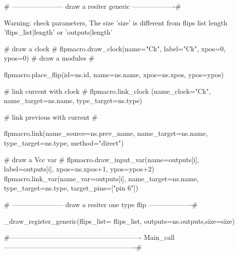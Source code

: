 {%
{%
{%
{# -----------------------
 draw a resiter generic
-------------------#}
{%

{%
 Warning: check parameters, The size '{{size}}' is different from flips list length '{{flips_list|length}}' or
 '{{outputs|length}}'
{%
    {# draw a clock #}
    {{ flpmacro.draw_clock(name="Ck", label="Ck", xpos=0, ypos=0)}}
    {# draw a modules #}
    {%
    {%
    {%
        {%
        {%
        {%
        {%
        {{ flpmacro.place_flip(id=ns.id, name=ns.name, xpos=ns.xpos, ypos=ypos)}}

        {# link current with clock #}
        {{ flpmacro.link_clock (name_clock="Ck", name_target=ns.name, type_target=ns.type)}}

        {# link previous with current #}
        {%
            {{ flpmacro.link(name_source=ns.prev_name, name_target=ns.name, type_target=ns.type, method="direct")}}
        {%

       {# draw a Vcc var #}
        {{ flpmacro.draw_input_var(name=outputs[i], label=outputs[i], xpos=ns.xpos+1, ypos=ypos+2)}}
        {{ flpmacro.link_var(name_var=outputs[i], name_target=ns.name, type_target=ns.type, target_pins=["pin 6"])}}

        {%
        {%
    {%

{%
{%


{# -----------------------
 draw a resiter one type flip
-------------------#}
{%
{%
{%
{%
    {%
{%
{{ _draw_register_generic(flips_list= flips_list, outputs=ns.outputs,size=size)}}

{%

{#----------------------------------------------------------
 Main_call
----------------------------------------------------------#}
}}}}}}}}}}}}}}}}}}}}}}}}}}}
